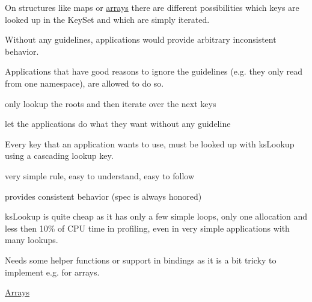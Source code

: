 On structures like maps or \hyperlink{doc_decisions_array_md}{arrays} there are different possibilities which keys are looked up in the Key\+Set and which are simply iterated.

Without any guidelines, applications would provide arbitrary inconsistent behavior.


\begin{DoxyItemize}
\item Applications that have good reasons to ignore the guidelines (e.\+g. they only read from one namespace), are allowed to do so.
\end{DoxyItemize}


\begin{DoxyItemize}
\item only lookup the roots and then iterate over the next keys
\item let the applications do what they want without any guideline
\end{DoxyItemize}

Every key that an application wants to use, must be looked up with {\ttfamily ks\+Lookup} using a cascading lookup key.


\begin{DoxyItemize}
\item very simple rule, easy to understand, easy to follow
\item provides consistent behavior ({\ttfamily spec} is always honored)
\item {\ttfamily ks\+Lookup} is quite cheap as it has only a few simple loops, only one allocation and less then 10\% of C\+PU time in profiling, even in very simple applications with many lookups.
\end{DoxyItemize}

Needs some helper functions or support in bindings as it is a bit tricky to implement e.\+g. for arrays.


\begin{DoxyItemize}
\item \hyperlink{doc_decisions_array_md}{Arrays}
\end{DoxyItemize}
